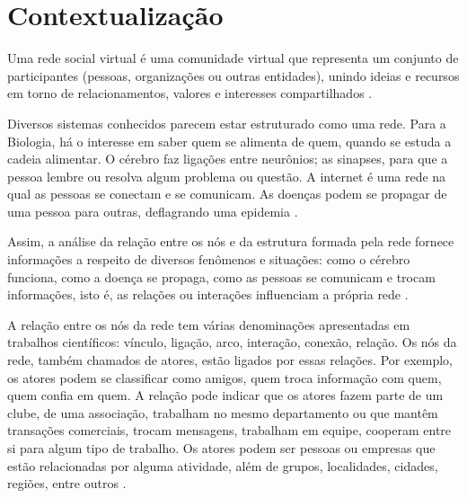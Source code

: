 









\frenchspacing 
\imprimircapa

\textual

\section*{Contextualização}


Uma rede social virtual é uma comunidade virtual que representa um conjunto de participantes (pessoas, organizações ou outras entidades), unindo ideias e recursos em torno de relacionamentos, valores e interesses compartilhados \cite{Marteleto:2001}.

Diversos sistemas conhecidos parecem estar estruturado como uma rede. Para a Biologia, há o interesse em saber quem se alimenta de quem, quando se estuda a cadeia alimentar. O cérebro faz ligações entre neurônios; as sinapses, para que a pessoa lembre ou resolva algum problema ou questão. A internet é uma rede na qual as pessoas se conectam e se comunicam. As doenças podem se propagar de uma pessoa para outras, deflagrando uma epidemia \cite{Goular:2014}.

Assim, a análise da relação entre os nós e da estrutura formada pela rede fornece informações a respeito de diversos fenômenos e situações: como o cérebro funciona, como a doença se propaga, como as pessoas se comunicam e trocam informações, isto é, as relações ou interações influenciam a própria rede \cite{Goular:2014}.

A relação entre os nós da rede tem várias denominações apresentadas em trabalhos científicos: vínculo, ligação, arco, interação, conexão, relação. Os nós da rede, também chamados de atores, estão ligados por essas relações. Por exemplo, os atores podem se classificar como amigos, quem troca informação com quem, quem confia em quem. A relação pode indicar que os atores fazem parte de um clube, de uma associação, trabalham no mesmo departamento ou que mantêm transações comerciais, trocam mensagens, trabalham em equipe, cooperam entre si para algum tipo de trabalho. Os atores podem ser pessoas ou empresas que estão relacionadas por alguma atividade, além de grupos, localidades, cidades, regiões, entre outros \cite{Hanneman:Riddle:2005}.

